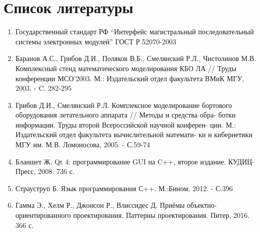 \section*{Список литературы}

\begin{enumerate}
 \sloppy
 \item \label{gost_r_52070-2003} Государственный стандарт РФ ``Интерфейс 
магистральный последовательный системы электронных модулей'' ГОСТ Р 52070-2003
 \item \label{stand} Баранов А.С., Грибов Д.И., Поляков В.Б., Смелянский Р.Л., 
Чистолинов М.В. Комплексный стенд математического моделирования
КБО ЛА // Труды конференции МСО'2003. М.: Издательский отдел
факультета ВМиК МГУ, 2003. - C. 282-295
 \item \label{stand2} Грибов Д.И., Смелянский Р.Л. Комплексное моделирование 
бортового оборудования летательного аппарата // Методы и средства обра-
ботки информации. Труды второй Всероссийской научной конферен-
ции. М.: Издательский отдел факультета вычислительной математи-
ки и кибернетики МГУ им. М.В. Ломоносова, 2005. - С.59-74 
 \item \label{blanshet_qt4} Бланшет Ж. Qt 4: программирование GUI на C++, 
второе издание. КУДИЦ-Пресс, 2008. 736 с.
 \item \label{straustrup} Страуструп Б. Язык программирования С++. М.:Бином, 
2012. - С.396
 \item \label{gof} Гамма Э., Хелм Р., Джонсон Р., Влиссидес Д. Приёмы 
объектно-ориентированного проектирования. Паттерны проектирования. Питер, 2016. 
366 с.
\end{enumerate}
